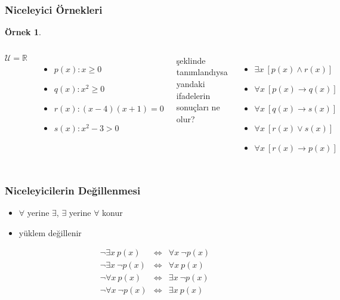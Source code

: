 \documentclass[dvipsnames]{beamer}
\theoremstyle{definition}
\theoremstyle{example}
\newtheorem{ornek}[theorem]{Örnek}
\theoremstyle{plain}
\begin{document}
\begin{frame}
  \frametitle{Niceleyici Örnekleri}

  \begin{ornek}
    \begin{columns}[t]
      $\mathcal{U} = \mathbb{R}$\\

      \begin{itemize}
        \item $p(x): x \geq 0$
        \item $q(x): x^2 \geq 0$
        \item $r(x): (x-4) (x+1) = 0$
        \item $s(x): x^2 -3 > 0$
      \end{itemize}

      şeklinde tanımlandıysa yandaki ifadelerin sonuçları ne olur?

      \begin{itemize}
        \pause
        \item $\exists x~[p(x) \wedge r(x)]$

        \pause
        \item $\forall x~[p(x) \rightarrow q(x)]$

        \pause
        \item $\forall x~[q(x) \rightarrow s(x)]$

        \pause
        \item $\forall x~[r(x) \vee s(x)]$

        \pause
        \item $\forall x~[r(x) \rightarrow p(x)]$
      \end{itemize}
    \end{columns}
  \end{ornek}
\end{frame}

\begin{frame}
  \frametitle{Niceleyicilerin Değillenmesi}

  \begin{itemize}
    \item $\forall$ yerine $\exists$, $\exists$ yerine $\forall$ konur
    \item yüklem değillenir
  \end{itemize}

  \pause
  \begin{eqnarray*}
    \neg \exists x~p(x)      & \Leftrightarrow & \forall x~\neg p(x)\\
    \neg \exists x~\neg p(x) & \Leftrightarrow & \forall x~p(x)\\
    \neg \forall x~p(x)      & \Leftrightarrow & \exists x~\neg p(x)\\
    \neg \forall x~\neg p(x) & \Leftrightarrow & \exists x~p(x)
  \end{eqnarray*}
\end{frame}
\end{document}
